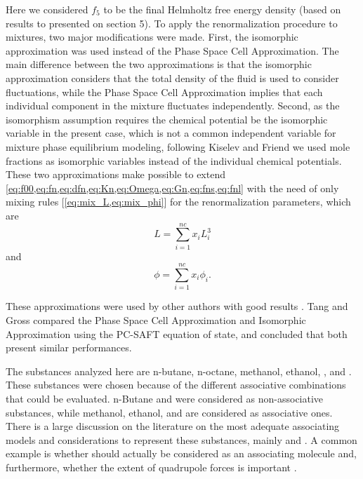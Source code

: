 \documentclass[preprint,12pt,3p]{elsarticle}
\begin{document}
    Here we considered $f_{5}$ to be the final Helmholtz free energy density (based on results to presented on section 5). To apply the renormalization procedure to mixtures, two major modifications were made. First, the isomorphic approximation \citep{fisher1968renormalization} was used instead of the Phase Space Cell Approximation. The main difference between the two approximations is that the isomorphic approximation considers that the total density of the fluid is used to consider fluctuations, while the Phase Space Cell Approximation implies that each individual component in the mixture fluctuates independently. Second, as the isomorphism assumption requires the chemical potential be the isomorphic variable in the present case, which is not a common independent variable for mixture phase equilibrium modeling, following Kiselev and Friend \citep{kiselev1999cubic} we used mole fractions as isomorphic variables instead of the individual chemical potentials. These two approximations make possible to extend \cref{eq:f00,eq:fn,eq:dfn,eq:Kn,eq:Omega,eq:Gn,eq:fns,eq:fnl} with the need of only mixing rules [\cref{eq:mix_L,eq:mix_phi}] for the renormalization parameters, which are
\begin{equation} \label{eq:mix_L}
    L = \sum_{i=1}^{nc}x_{i}L_{i}^{3}
\end{equation}
and
\begin{equation} \label{eq:mix_phi}
    \phi = \sum_{i=1}^{nc}x_{i}\phi_{i}.
\end{equation}
    
    These approximations were used by other authors with good results \cite{cai2004thermodynamics,llovell2006global,sun2005application,pcm2017application,xu2011prediction}. Tang and Gross \citep{tang2010renormalization} compared the Phase Space Cell Approximation and Isomorphic Approximation using the PC-SAFT equation of state, and concluded that both present similar performances.

    The substances analyzed here are n-butane, n-octane, methanol, ethanol, , and . These substances were chosen because of the different associative combinations that could be evaluated. n-Butane and  were considered as non-associative substances, while methanol, ethanol, and  are considered as associative ones. There is a large discussion on the literature on the most adequate associating models and considerations to represent these substances, mainly  \citep{bjorner2016modeling} and  \citep{ruffine2006represent}. A common example is whether  should actually be considered as an associating molecule and, furthermore, whether the extent of quadrupole forces is important \cite{tsivintzelis2011modeling,bjorner2016modeling}.
    
\end{document}
